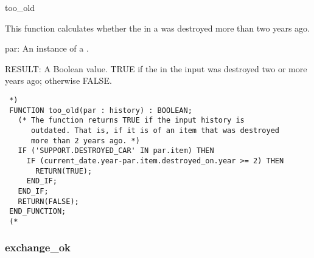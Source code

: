 \documentclass{article}
\begin{document}
 \begin{Mnamedesc}{too_old}

 \begin{Mdesctext}

 This function calculates whether the  in a  was
 destroyed more than two years ago.

 \end{Mdesctext}

 \begin{Ipars}

 \item[par:] An instance of a .

 \item[RESULT:] A Boolean value. TRUE if the  in the input
  was destroyed two or more years ago; otherwise FALSE.

 \end{Ipars}

 \begin{Mexp}
 \begin{verbatim}
 *)
 FUNCTION too_old(par : history) : BOOLEAN;
   (* The function returns TRUE if the input history is 
      outdated. That is, if it is of an item that was destroyed 
      more than 2 years ago. *) 
   IF ('SUPPORT.DESTROYED_CAR' IN par.item) THEN
     IF (current_date.year-par.item.destroyed_on.year >= 2) THEN
       RETURN(TRUE);
     END_IF;
   END_IF;
   RETURN(FALSE);
 END_FUNCTION;
 (*
 \end{verbatim}
 \end{Mexp}
 \end{Mnamedesc}

 \subsubsection{exchange\_ok}
\end{document}
